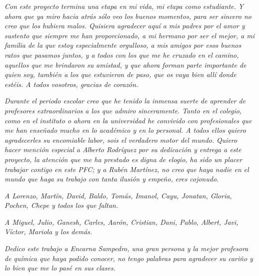
\begin{flushright}
    \begin{minipage}{.85\textwidth}
	\begin{flushright}
	    {\em Con este proyecto termina una etapa en mi vida, mi etapa
	    como estudiante. Y ahora que ya miro hacia atrás sólo veo los
	    buenos momentos, para ser sincero no creo que los hubiera
	    malos. Quisiera agradecer aquí a mis padres por el amor y
	    sustento que siempre me han proporcionado, a mi hermano por ser
	    el mejor, a mi familia de la que estoy especialmente orgulloso,
	    a mis amigos por esos buenos ratos que pasamos juntos, y a
	    todos con los que me he cruzado en el camino, aquellos que me
	    brindaron su amistad, y que ahora forman parte importante de
	    quien soy, también a los que estuvieron de paso, que os vaya
	    bien allí donde estéis. A todos vosotros, gracias de
	    corazón.}\medskip

	    {\em Durante el periodo escolar creo que he tenido la inmensa
	    suerte de aprender de profesores extraordinarios a los que
	    admiro sinceramente. Tanto en el colegio, como en el instituto
	    o ahora en la universidad he convivido con profesionales que me
	    han enseñado mucho en lo académico y en lo personal. A todos
	    ellos quiero agradecerles su encomiable labor, sois el
	    verdadero motor del mundo. Quiero hacer mención especial a
	    Alberto Rodríguez por su dedicación y entrega a este proyecto,
	    la atención que me ha prestado es digna de elogio, ha sido un
	    placer trabajar contigo en este PFC; y a Rubén Martínez, no
	    creo que haya nadie en el mundo que haga su trabajo con tanta
	    ilusión y empeño, eres cojonudo.}\medskip

	    {\em A Lorenzo, Martín, David, Baldo, Tomás, Imanol, Cayu,
	    Jonatan, Gloria, Pochen, Chepe y todos los que faltan.}\medskip

	    {\em A Miguel, Julio, Ganesh, Carles, Aarón, Cristian, Dani,
	    Pablo, Albert, Javi, Víctor, Mariola y los demás.}
	    \vspace{8\medskipamount}

	    {\em Dedico este trabajo a Encarna Sampedro, una gran persona y
	    la mejor profesora de química que haya podido conocer, no tengo
	    palabras para agradecer su cariño y lo bien que me lo pasé en
	    sus clases.}
	\end{flushright}
    \end{minipage}
\end{flushright}


\cleardoublepage
